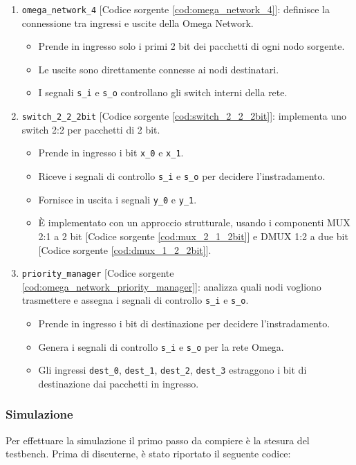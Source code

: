\begin{enumerate}
    \item \texttt{omega\_network\_4} [Codice sorgente \ref{cod:omega_network_4}]: definisce la connessione tra ingressi e uscite della Omega Network.
    \begin{itemize}
        \item Prende in ingresso solo i primi 2 bit dei pacchetti di ogni nodo sorgente.
        \item Le uscite sono direttamente connesse ai nodi destinatari.
        \item I segnali \texttt{s\_i} e \texttt{s\_o} controllano gli switch interni della rete.
    \end{itemize}
    \item \texttt{switch\_2\_2\_2bit} [Codice sorgente \ref{cod:switch_2_2_2bit}]: implementa uno switch 2:2 per pacchetti di 2 bit.
    \begin{itemize}
        \item Prende in ingresso i bit \texttt{x\_0} e \texttt{x\_1}.
        \item Riceve i segnali di controllo \texttt{s\_i} e \texttt{s\_o} per decidere l'instradamento.
        \item Fornisce in uscita i segnali \texttt{y\_0} e \texttt{y\_1}.
        \item È implementato con un approccio strutturale, usando i componenti MUX 2:1 a 2 bit [Codice sorgente \ref{cod:mux_2_1_2bit}] e DMUX 1:2 a due bit [Codice sorgente \ref{cod:dmux_1_2_2bit}].
    \end{itemize}
    \item \texttt{priority\_manager} [Codice sorgente \ref{cod:omega_network_priority_manager}]: analizza quali nodi vogliono trasmettere e assegna i segnali di controllo \texttt{s\_i} e \texttt{s\_o}.
    \begin{itemize}
        \item Prende in ingresso i bit di destinazione per decidere l'instradamento.
        \item Genera i segnali di controllo \texttt{s\_i} e \texttt{s\_o} per la rete Omega.
        \item Gli ingressi \texttt{dest\_0}, \texttt{dest\_1}, \texttt{dest\_2}, \texttt{dest\_3} estraggono i bit di destinazione dai pacchetti in ingresso.
    \end{itemize}
\end{enumerate}

\subsubsection{Simulazione}
Per effettuare la simulazione il primo passo da compiere è la stesura del testbench. Prima di discuterne, è stato riportato il seguente codice:

